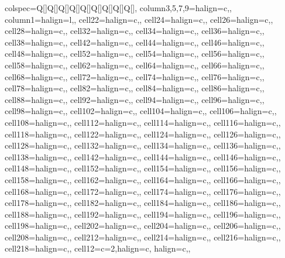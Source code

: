 \begin{table}
\centering
\begin{talltblr}[         %
entry=none,label=none,
note{}={+ p \num{< 0.1}, * p \num{< 0.05}, ** p \num{< 0.01}, *** p \num{< 0.001}},
]                     %
{                     %
colspec={Q[]Q[]Q[]Q[]Q[]Q[]Q[]Q[]Q[]},
column{3,5,7,9}={}{halign=c,},
column{1}={}{halign=l,},
cell{2}{2}={}{halign=c,},
cell{2}{4}={}{halign=c,},
cell{2}{6}={}{halign=c,},
cell{2}{8}={}{halign=c,},
cell{3}{2}={}{halign=c,},
cell{3}{4}={}{halign=c,},
cell{3}{6}={}{halign=c,},
cell{3}{8}={}{halign=c,},
cell{4}{2}={}{halign=c,},
cell{4}{4}={}{halign=c,},
cell{4}{6}={}{halign=c,},
cell{4}{8}={}{halign=c,},
cell{5}{2}={}{halign=c,},
cell{5}{4}={}{halign=c,},
cell{5}{6}={}{halign=c,},
cell{5}{8}={}{halign=c,},
cell{6}{2}={}{halign=c,},
cell{6}{4}={}{halign=c,},
cell{6}{6}={}{halign=c,},
cell{6}{8}={}{halign=c,},
cell{7}{2}={}{halign=c,},
cell{7}{4}={}{halign=c,},
cell{7}{6}={}{halign=c,},
cell{7}{8}={}{halign=c,},
cell{8}{2}={}{halign=c,},
cell{8}{4}={}{halign=c,},
cell{8}{6}={}{halign=c,},
cell{8}{8}={}{halign=c,},
cell{9}{2}={}{halign=c,},
cell{9}{4}={}{halign=c,},
cell{9}{6}={}{halign=c,},
cell{9}{8}={}{halign=c,},
cell{10}{2}={}{halign=c,},
cell{10}{4}={}{halign=c,},
cell{10}{6}={}{halign=c,},
cell{10}{8}={}{halign=c,},
cell{11}{2}={}{halign=c,},
cell{11}{4}={}{halign=c,},
cell{11}{6}={}{halign=c,},
cell{11}{8}={}{halign=c,},
cell{12}{2}={}{halign=c,},
cell{12}{4}={}{halign=c,},
cell{12}{6}={}{halign=c,},
cell{12}{8}={}{halign=c,},
cell{13}{2}={}{halign=c,},
cell{13}{4}={}{halign=c,},
cell{13}{6}={}{halign=c,},
cell{13}{8}={}{halign=c,},
cell{14}{2}={}{halign=c,},
cell{14}{4}={}{halign=c,},
cell{14}{6}={}{halign=c,},
cell{14}{8}={}{halign=c,},
cell{15}{2}={}{halign=c,},
cell{15}{4}={}{halign=c,},
cell{15}{6}={}{halign=c,},
cell{15}{8}={}{halign=c,},
cell{16}{2}={}{halign=c,},
cell{16}{4}={}{halign=c,},
cell{16}{6}={}{halign=c,},
cell{16}{8}={}{halign=c,},
cell{17}{2}={}{halign=c,},
cell{17}{4}={}{halign=c,},
cell{17}{6}={}{halign=c,},
cell{17}{8}={}{halign=c,},
cell{18}{2}={}{halign=c,},
cell{18}{4}={}{halign=c,},
cell{18}{6}={}{halign=c,},
cell{18}{8}={}{halign=c,},
cell{19}{2}={}{halign=c,},
cell{19}{4}={}{halign=c,},
cell{19}{6}={}{halign=c,},
cell{19}{8}={}{halign=c,},
cell{20}{2}={}{halign=c,},
cell{20}{4}={}{halign=c,},
cell{20}{6}={}{halign=c,},
cell{20}{8}={}{halign=c,},
cell{21}{2}={}{halign=c,},
cell{21}{4}={}{halign=c,},
cell{21}{6}={}{halign=c,},
cell{21}{8}={}{halign=c,},
cell{1}{2}={c=2,}{halign=c, halign=c,},
}
\end{talltblr}
\end{table}
